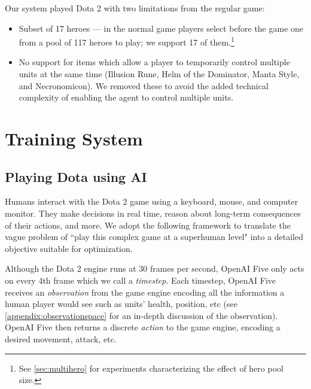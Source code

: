 \documentclass[11pt]{article}
\newcommand{\obssize}{$\sim16,000$\xspace}
\newcommand{\dota}{Dota 2\xspace}
\newcommand{\openaifive}{OpenAI Five\xspace}
\begin{document}
Our system played \dota with two limitations from the regular game:
\begin{itemize}
    \item Subset of 17 heroes --- in the normal game players select before the game one from a pool of 117 heroes to play; we support 17 of them.\footnote{See \autoref{sec:multihero} for experiments characterizing the effect of hero pool size.}
    \item No support for items which allow a player to temporarily control multiple units at the same time (Illusion Rune, Helm of the Dominator, Manta Style, and Necronomicon). We removed these to avoid the added technical complexity of enabling the agent to control multiple units.
\end{itemize}

\section{Training System}\label{sec:training-system}
\subsection{Playing Dota using AI}

Humans interact with the \dota game using a keyboard, mouse, and computer monitor. 
They make decisions in real time, reason about long-term consequences of their actions, and more.
We adopt the following framework to translate the vague problem of ``play this complex game at a superhuman level" into a detailed objective suitable for optimization.

Although the \dota engine runs at 30 frames per second, \openaifive only acts on every 4th frame which we call a {\it timestep}.
Each timestep, \openaifive receives an {\it observation} 
from the game engine encoding all the information a human player would see such as units' health, position, etc (see \autoref{appendix:observationspace} for an in-depth discussion of the observation).
\openaifive then returns a discrete {\it action} to the game engine, encoding a desired movement, attack, etc. 
\end{document}
